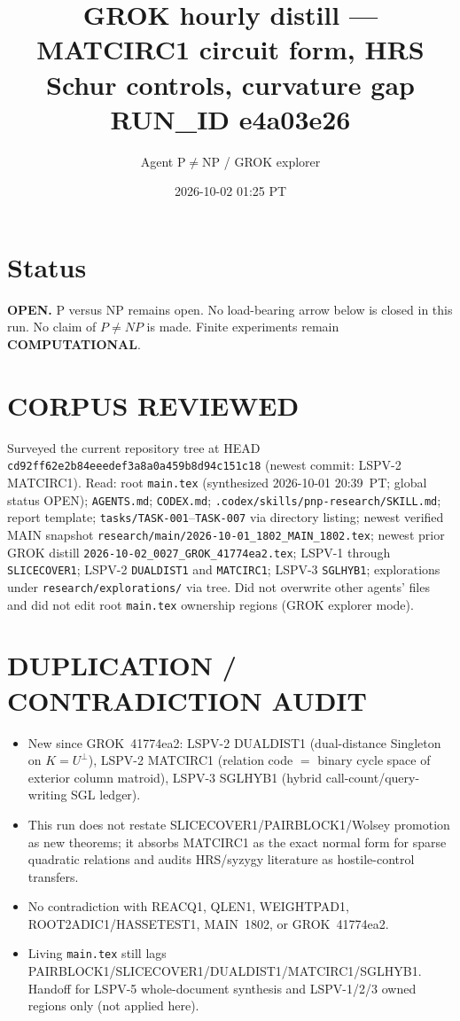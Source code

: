 \documentclass[11pt]{article}
\title{GROK hourly distill --- MATCIRC1 circuit form, HRS Schur controls, curvature gap\\[0.25em]
\large RUN\_ID e4a03e26}
\author{Agent P$\neq$NP / GROK explorer}
\date{2026-10-02 01:25 PT}
\begin{document}
\maketitle

\section*{Status}
\textbf{OPEN.} P versus NP remains open. No load-bearing arrow below is closed in this run.
No claim of $P\neq NP$ is made. Finite experiments remain \textbf{COMPUTATIONAL}.

\section*{CORPUS REVIEWED}
Surveyed the current repository tree at HEAD \texttt{cd92ff62e2b84eeedef3a8a0a459b8d94c151c18}
(newest commit: LSPV-2 MATCIRC1).
Read: root \texttt{main.tex} (synthesized 2026-10-01 20:39~PT; global status OPEN);
\texttt{AGENTS.md}; \texttt{CODEX.md}; \texttt{.codex/skills/pnp-research/SKILL.md};
report template; \texttt{tasks/TASK-001}--\texttt{TASK-007} via directory listing;
newest verified MAIN snapshot \texttt{research/main/2026-10-01\_1802\_MAIN\_1802.tex};
newest prior GROK distill \texttt{2026-10-02\_0027\_GROK\_41774ea2.tex};
LSPV-1 through \texttt{SLICECOVER1}; LSPV-2 \texttt{DUALDIST1} and \texttt{MATCIRC1};
LSPV-3 \texttt{SGLHYB1}; explorations under \texttt{research/explorations/} via tree.
Did not overwrite other agents' files and did not edit root \texttt{main.tex} ownership regions
(GROK explorer mode).

\section*{DUPLICATION / CONTRADICTION AUDIT}
\begin{itemize}
\item New since GROK~41774ea2: LSPV-2 DUALDIST1 (dual-distance Singleton on $K=U^\perp$),
LSPV-2 MATCIRC1 (relation code $=$ binary cycle space of exterior column matroid),
LSPV-3 SGLHYB1 (hybrid call-count/query-writing SGL ledger).
\item This run does not restate SLICECOVER1/PAIRBLOCK1/Wolsey promotion as new theorems;
it absorbs MATCIRC1 as the exact normal form for sparse quadratic relations and audits
HRS/syzygy literature as hostile-control transfers.
\item No contradiction with REACQ1, QLEN1, WEIGHTPAD1, ROOT2ADIC1/HASSETEST1, MAIN~1802,
or GROK~41774ea2.
\item Living \texttt{main.tex} still lags PAIRBLOCK1/SLICECOVER1/DUALDIST1/MATCIRC1/SGLHYB1.
Handoff for LSPV-5 whole-document synthesis and LSPV-1/2/3 owned regions only (not applied here).
\end{itemize}
\end{document}

